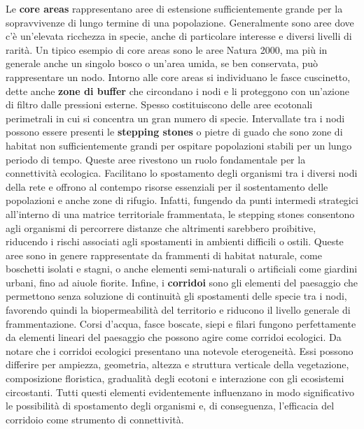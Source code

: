 \documentclass[
]{book}
\begin{document}
Le \textbf{core areas} rappresentano aree di estensione sufficientemente
grande per la sopravvivenze di lungo termine di una popolazione.
Generalmente sono aree dove c'è un'elevata ricchezza in specie, anche di
particolare interesse e diversi livelli di rarità. Un tipico esempio di
core areas sono le aree Natura 2000, ma più in generale anche un singolo
bosco o un'area umida, se ben conservata, può rappresentare un nodo.
Intorno alle core areas si individuano le fasce cuscinetto, dette anche
\textbf{zone di buffer} che circondano i nodi e li proteggono con un'azione
di filtro dalle pressioni esterne. Spesso costituiscono delle aree
ecotonali perimetrali in cui si concentra un gran numero di specie.
Intervallate tra i nodi possono essere presenti le \textbf{stepping stones} o
pietre di guado che sono zone di habitat non sufficientemente grandi per
ospitare popolazioni stabili per un lungo periodo di tempo. Queste aree
rivestono un ruolo fondamentale per la connettività ecologica.
Facilitano lo spostamento degli organismi tra i diversi nodi della rete
e offrono al contempo risorse essenziali per il sostentamento delle
popolazioni e anche zone di rifugio. Infatti, fungendo da punti
intermedi strategici all'interno di una matrice territoriale
frammentata, le stepping stones consentono agli organismi di percorrere
distanze che altrimenti sarebbero proibitive, riducendo i rischi
associati agli spostamenti in ambienti difficili o ostili. Queste aree
sono in genere rappresentate da frammenti di habitat naturale, come
boschetti isolati e stagni, o anche elementi semi-naturali o artificiali
come giardini urbani, fino ad aiuole fiorite. Infine, i \textbf{corridoi}
sono gli elementi del paesaggio che permettono senza soluzione di
continuità gli spostamenti delle specie tra i nodi, favorendo quindi la
biopermeabilità del territorio e riducono il livello generale di
frammentazione. Corsi d'acqua, fasce boscate, siepi e filari fungono
perfettamente da elementi lineari del paesaggio che possono agire come
corridoi ecologici. Da notare che i corridoi ecologici presentano una
notevole eterogeneità. Essi possono differire per ampiezza, geometria,
altezza e struttura verticale della vegetazione, composizione
floristica, gradualità degli ecotoni e interazione con gli ecosistemi
circostanti. Tutti questi elementi evidentemente influenzano in modo
significativo le possibilità di spostamento degli organismi e, di
conseguenza, l'efficacia del corridoio come strumento di connettività.
\end{document}
